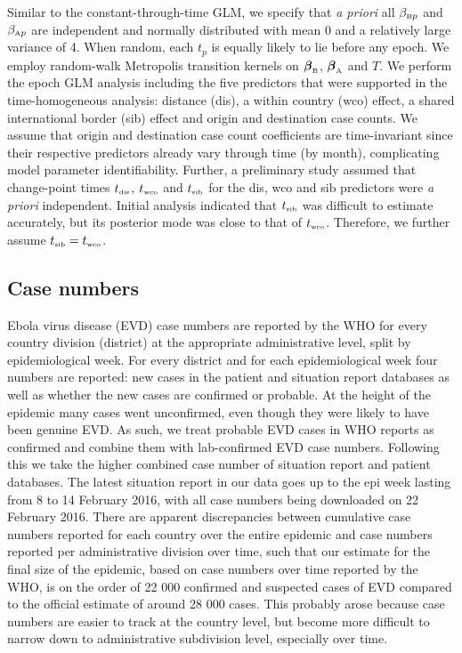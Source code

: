 \documentclass[11pt,oneside,letterpaper]{article}
\newcommand{\coefficient}{\ensuremath{\beta}}
\newcommand{\increment}{\ensuremath{\beta}}
\newcommand{\predictorLabel}[1]{_{\mbox{\tiny #1}}}
\newcommand{\markA}{\text{\tiny B}}
\newcommand{\markB}{\text{\tiny A}}
\begin{document}
Similar to the constant-through-time GLM, we specify that \textit{a priori} all $\coefficient_{\markA p}$ and 
 $\coefficient_{\markB p}$
are independent and normally distributed with mean 0 and a relatively large variance of 4.
When random, each $t_p$ is equally likely to lie before any epoch.
We employ random-walk Metropolis transition kernels on $\boldsymbol{\coefficient}_{\markA}$, 
$\boldsymbol{\coefficient}_{\markB}$
and $T$.
%
We perform the epoch GLM analysis including the five predictors that were supported in the time-homogeneous analysis:  distance (dis), a within country (wco) effect, a shared international border (sib) effect and origin and destination case counts.
We assume that origin and destination case count coefficients are time-invariant since their respective predictors already vary through time (by month), complicating model parameter identifiability.
Further, a preliminary study assumed that change-point times $t\predictorLabel{dis}$, $t\predictorLabel{wco}$ and $t\predictorLabel{sib}$ for the dis, wco and sib predictors were \textit{a priori} independent. 
Initial analysis indicated that $t\predictorLabel{sib}$ was difficult to estimate accurately, but its posterior mode was close to that of $t\predictorLabel{wco}$.
Therefore, we further assume $t\predictorLabel{sib} = t\predictorLabel{wco}$.

\subsection*{Case numbers}

Ebola virus disease (EVD) case numbers are reported by the WHO for every country division (district) at the appropriate administrative level, split by epidemiological week.
For every district and for each epidemiological week four numbers are reported: new cases in the patient and situation report databases as well as whether the new cases are confirmed or probable.
At the height of the epidemic many cases went unconfirmed, even though they were likely to have been genuine EVD.
As such, we treat probable EVD cases in WHO reports as confirmed and combine them with lab-confirmed EVD case numbers.
Following this we take the higher combined case number of situation report and patient databases.
The latest situation report in our data goes up to the epi week lasting from 8 to 14 February 2016, with all case numbers being downloaded on 22 February 2016.
There are apparent discrepancies between cumulative case numbers reported for each country over the entire epidemic and case numbers reported per administrative division over time, such that our estimate for the final size of the epidemic, based on case numbers over time reported by the WHO, is on the order of 22 000 confirmed and suspected cases of EVD compared to the official estimate of around 28 000 cases.
This probably arose because case numbers are easier to track at the country level, but become more difficult to narrow down to administrative subdivision level, especially over time.
\end{document}
